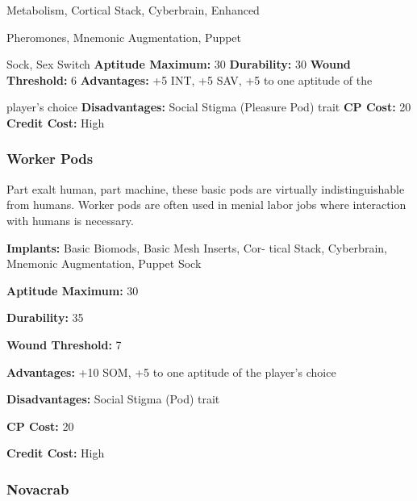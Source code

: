 Metabolism, Cortical Stack, Cyberbrain, Enhanced 

Pheromones, Mnemonic Augmentation, Puppet 

Sock, Sex Switch
\textbf{Aptitude Maximum: }30
\textbf{Durability:} 30
\textbf{Wound Threshold:} 6
\textbf{Advantages:} +5 INT, +5 SAV, +5 to one aptitude of the 

player's choice
\textbf{Disadvantages: }Social Stigma (Pleasure Pod) trait
\textbf{CP Cost: }20
\textbf{Credit Cost: }High

\subsubsection{Worker Pods}

Part exalt human, part machine, these basic pods are 
virtually indistinguishable from humans. Worker pods 
are often used in menial labor jobs where interaction 
with humans is necessary.

\textbf{Implants: }Basic Biomods, Basic Mesh Inserts, Cor-
tical Stack, Cyberbrain, Mnemonic Augmentation, 
Puppet Sock

\textbf{Aptitude Maximum: }30

\textbf{Durability: }35

\textbf{Wound Threshold:} 7

\textbf{Advantages: }+10 SOM, +5 to one aptitude of the 
player's choice

\textbf{Disadvantages: }Social Stigma (Pod) trait

\textbf{CP Cost:} 20

\textbf{Credit Cost: }High

\subsubsection{Novacrab}

